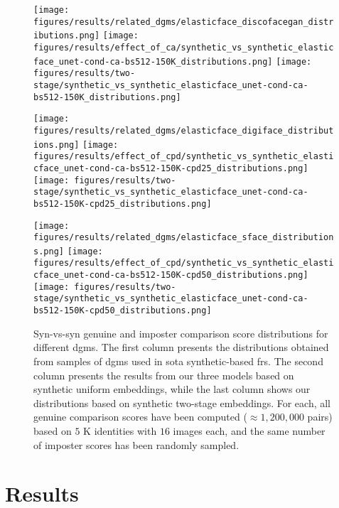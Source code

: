 \documentclass[10pt,twocolumn,letterpaper]{article}
\begin{document}
\begin{figure}[h]
\begin{center}

  \texttt{[image: figures/results/related\_dgms/elasticface\_discofacegan\_distributions.png]}
  \texttt{[image: figures/results/effect\_of\_ca/synthetic\_vs\_synthetic\_elasticface\_unet-cond-ca-bs512-150K\_distributions.png]}
  \texttt{[image: figures/results/two-stage/synthetic\_vs\_synthetic\_elasticface\_unet-cond-ca-bs512-150K\_distributions.png]}

  \texttt{[image: figures/results/related\_dgms/elasticface\_digiface\_distributions.png]}
  \texttt{[image: figures/results/effect\_of\_cpd/synthetic\_vs\_synthetic\_elasticface\_unet-cond-ca-bs512-150K-cpd25\_distributions.png]}
  \texttt{[image: figures/results/two-stage/synthetic\_vs\_synthetic\_elasticface\_unet-cond-ca-bs512-150K-cpd25\_distributions.png]}

  \texttt{[image: figures/results/related\_dgms/elasticface\_sface\_distributions.png]}
  \texttt{[image: figures/results/effect\_of\_cpd/synthetic\_vs\_synthetic\_elasticface\_unet-cond-ca-bs512-150K-cpd50\_distributions.png]}
  \texttt{[image: figures/results/two-stage/synthetic\_vs\_synthetic\_elasticface\_unet-cond-ca-bs512-150K-cpd50\_distributions.png]}
\end{center}
   \vspace{-5mm}
   \caption{Syn-vs-syn genuine and imposter comparison score distributions for different \acrshort{dgm}s. The first column presents the distributions obtained from samples of \acrshort{dgm}s used in \acrshort{sota} synthetic-based \acrshort{fr}s. The second column presents the results from our three models based on synthetic uniform embeddings, while the last column shows our distributions based on synthetic two-stage embeddings. For each, all genuine comparison scores have been computed ($\approx1{,}200{,}000$ pairs) based on $5$ K identities with $16$ images each, and the same number of imposter scores has been randomly sampled.}
\label{fig:syn_vs_syn_distributios_overview}
\vspace{-3mm}
\end{figure}

\vspace{-4mm}
\section{Results}
\vspace{-2mm}
\end{document}
